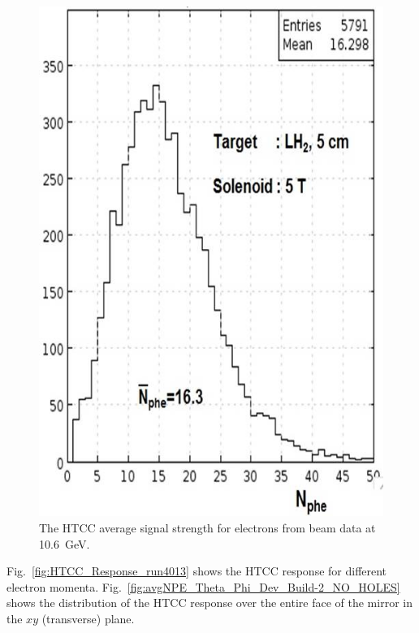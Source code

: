 \begin{figure}[!ht]
    \centering
    \includegraphics[width=1.0\linewidth,trim={0.0cm 0.0cm 0.0cm 0.0cm},clip]{images/Average_HTCC_Signal.jpg}
    \caption{The HTCC average signal strength for electrons from beam data at 10.6~GeV.}
    \label{fig:Average_HTCC_Signal}
\end{figure}

Fig.~\ref{fig:HTCC_Response_run4013} shows the HTCC response for different electron momenta.
Fig.~\ref{fig:avgNPE_Theta_Phi_Dev_Build-2_NO_HOLES}  shows the distribution of the HTCC response over
the entire face of the mirror in the $xy$ (transverse) plane. 


